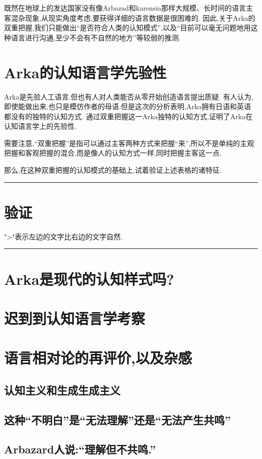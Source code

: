 既然在地球上的发达国家没有像Arbazad和karensia那样大规模、长时间的语言主客混杂现象,从现实角度考虑,要获得详细的语言数据是很困难的.
因此,关于Arka的双重把握,我们只能做出``是否符合人类的认知模式'',以及``目前可以毫无问题地用这种语言进行沟通,至少不会有不自然的地方''等较弱的推测.

\section{Arka的认知语言学先验性}
Arka是先验人工语言.但也有人对人类能否从零开始创造语言提出质疑.
有人认为,即使能做出来,也只是模仿作者的母语.但是这次的分析表明,Arka拥有日语和英语都没有的独特的认知方式.
通过双重把握这一Arka独特的认知方式,证明了Arka在认知语言学上的先验性.

需要注意,``双重把握''是指可以通过主客两种方式来把握``来'',所以不是单纯的主观把握和客观把握的混合,而是像人的认知方式一样,同时把握主客这一点.

那么,在这种双重把握的认知模式的基础上,试着验证上述表格的诸特征.

{\noindent} \rule[-10pt]{17.5cm}{0.05em}
\section{验证}

">"表示左边的文字比右边的文字自然.

{\noindent} \rule[-10pt]{17.5cm}{0.05em}

\section{Arka是现代的认知样式吗?}
\section{迟到到认知语言学考察}
\section{语言相对论的再评价,以及杂感}
\subsection{认知主义和生成生成主义}
\subsection{这种``不明白''是``无法理解''还是``无法产生共鸣''}
\subsection{Arbazard人说:``理解但不共鸣.''}
